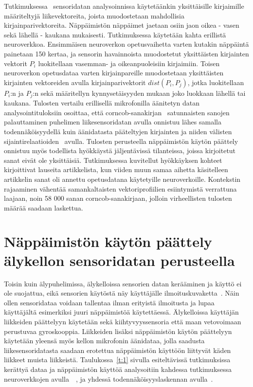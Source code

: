 \documentclass[finnish]{tktltiki2}
\theoremstyle{definition}
\theoremstyle{remark}
\begin{document}
Tutkimuksessa~\cite{mar} sensoridatan analysoinnissa käytetäänkin yksittäisille kirjaimille määriteltyjä liikevektoreita, joista muodostetaan mahdollisia kirjainparivektoreita. Näppäimistön näppäimet jaetaan osiin jaon oikea - vasen sekä lähellä - kaukana mukaisesti. Tutkimuksessa käytetään kahta erillistä neuroverkkoa. Ensimmäisen neuroverkon opetusvaihetta varten kutakin näppäintä painetaan 150 kertaa, ja sensorin havainnoista muodostetut yksittäisten kirjainten vektorit $P_i$ luokitellaan vasemman- ja oikeanpuoleisiin kirjaimiin. Toisen neuroverkon opetusdataa varten kirjainpareille muodostetaan yksittäisten kirjainten vektoreiden avulla kirjainparivektorit $dist(P_i,P_j)$, jotka luokitellaan $P_i$:n ja $P_j$:n sekä määritellyn kynnysetäisyyden mukaan joko luokkaan lähellä tai kaukana. Tulosten vertailu erillisellä mikrofonilla äänitetyn datan analysointituloksiin osoittaa, että corncob-sanakirjan~\cite{corn} satunnaisten sanojen palauttaminen puhelimen liikesensoridatan avulla onnistuu lähes samalla todennäköisyydellä kuin äänidatasta pääteltyjen kirjainten ja niiden välisten sijaintirelaatioiden~\cite{berger} avulla. Tulosten perusteella näppäimistön käytön päättely onnistuu myös todellista hyökkäystä jäljentävissä tilanteissa, joissa kirjoitetut sanat eivät ole yksittäisiä. Tutkimuksessa kuvitellut hyökkäyksen kohteet kirjoittivat lauseita artikkelista, kun viiden muun samaa aihetta käsitelleen artikkelin sanat oli annettu opetusdatana käytetyille neuroverkoille. Kontekstin rajaaminen vähentää samankaltaisten vektoriprofiilien esiintymistä verrattuna laajaan, noin 58 000 sanan corncob-sanakirjaan, jolloin virheellisten tulosten määrää saadaan laskettua.
 

\section{Näppäimistön käytön päättely älykellon sensoridatan perusteella}
Toisin kuin älypuhelimissa, älykelloissa sensorien datan kerääminen ja käyttö ei ole suojattua, eikä sensorien käytöstä näy käyttäjälle ilmoituskuvaketta~\cite{liu}. Näin ollen sensoridataa voidaan tallentaa ilman erityistä ilmoitusta ja lupaa käyttäjältä esimerkiksi juuri näppäimistöä käytettäessä.
Älykelloissa käyttäjän liikkeiden päättelyyn käytetään sekä kiihtyvyyssensoria että maan vetovoimaan perustuvaa gyroskooppia. Liikkeiden lisäksi näppäimistön käytön päättelyyn käytetään yleensä myös kellon mikrofonin äänidataa, jolla saadusta liikesensoridatasta saadaan erotettua näppäimistön käyttöön liittyvät käden liikkeet muista liikkeistä. Taulukossa~\ref{t:1} sivulla \pageref{t:1} esiteltävissä tutkimuksissa kerättyä dataa ja näppäimistön käyttöä analysoitiin kahdessa tutkimuksessa neuroverkkojen avulla~\cite{maiti}~\cite{liu}, ja yhdessä todennäköisyyslaskennan avulla~\cite{mole}.
\end{document}
